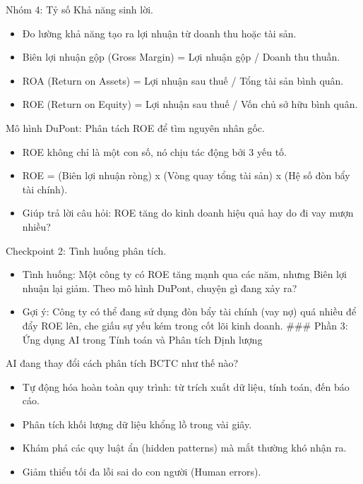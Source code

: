 \documentclass[aspectratio=169]{beamer}
\begin{document}
\begin{frame}{Nhóm 4: Tỷ số Khả năng sinh lời.}
    \begin{itemize}
        \item Đo lường khả năng tạo ra lợi nhuận từ doanh thu hoặc tài sản.
        \item Biên lợi nhuận gộp (Gross Margin) = Lợi nhuận gộp / Doanh thu thuần.
        \item ROA (Return on Assets) = Lợi nhuận sau thuế / Tổng tài sản bình quân.
        \item ROE (Return on Equity) = Lợi nhuận sau thuế / Vốn chủ sở hữu bình quân.
    \end{itemize}
\end{frame}


\begin{frame}{Mô hình DuPont: Phân tách ROE để tìm nguyên nhân gốc.}
    \begin{itemize}
        \item ROE không chỉ là một con số, nó chịu tác động bởi 3 yếu tố.
        \item ROE = (Biên lợi nhuận ròng) x (Vòng quay tổng tài sản) x (Hệ số đòn bẩy tài chính).
        \item Giúp trả lời câu hỏi: ROE tăng do kinh doanh hiệu quả hay do đi vay mượn nhiều?
    \end{itemize}
\end{frame}


\begin{frame}{Checkpoint 2: Tình huống phân tích.}
    \begin{itemize}
        \item Tình huống: Một công ty có ROE tăng mạnh qua các năm, nhưng Biên lợi nhuận lại giảm. Theo mô hình DuPont, chuyện gì đang xảy ra?
        \item Gợi ý: Công ty có thể đang sử dụng đòn bẩy tài chính (vay nợ) quá nhiều để đẩy ROE lên, che giấu sự yếu kém trong cốt lõi kinh doanh.
        ### Phần 3: Ứng dụng AI trong Tính toán và Phân tích Định lượng
    \end{itemize}
\end{frame}


\begin{frame}{AI đang thay đổi cách phân tích BCTC như thế nào?}
    \begin{itemize}
        \item Tự động hóa hoàn toàn quy trình: từ trích xuất dữ liệu, tính toán, đến báo cáo.
        \item Phân tích khối lượng dữ liệu khổng lồ trong vài giây.
        \item Khám phá các quy luật ẩn (hidden patterns) mà mắt thường khó nhận ra.
        \item Giảm thiểu tối đa lỗi sai do con người (Human errors).
    \end{itemize}
\end{frame}
\end{document}
